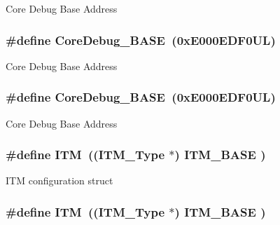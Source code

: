 Core Debug Base Address \hypertarget{group___c_m_s_i_s__core__register_ga680604dbcda9e9b31a1639fcffe5230b}{
\subsubsection[{Core\-Debug\-\_\-\-B\-A\-S\-E}]{\setlength{\rightskip}{0pt plus 5cm}\#define Core\-Debug\-\_\-\-B\-A\-S\-E~(0x\-E000\-E\-D\-F0\-U\-L)}}\label{group___c_m_s_i_s__core__register_ga680604dbcda9e9b31a1639fcffe5230b}
Core Debug Base Address \hypertarget{group___c_m_s_i_s__core__register_ga680604dbcda9e9b31a1639fcffe5230b}{
\subsubsection[{Core\-Debug\-\_\-\-B\-A\-S\-E}]{\setlength{\rightskip}{0pt plus 5cm}\#define Core\-Debug\-\_\-\-B\-A\-S\-E~(0x\-E000\-E\-D\-F0\-U\-L)}}\label{group___c_m_s_i_s__core__register_ga680604dbcda9e9b31a1639fcffe5230b}
Core Debug Base Address \hypertarget{group___c_m_s_i_s__core__register_gabae7cdf882def602cb787bb039ff6a43}{
\subsubsection[{I\-T\-M}]{\setlength{\rightskip}{0pt plus 5cm}\#define I\-T\-M~(({\bf I\-T\-M\-\_\-\-Type}       $\ast$)     {\bf I\-T\-M\-\_\-\-B\-A\-S\-E}      )}}\label{group___c_m_s_i_s__core__register_gabae7cdf882def602cb787bb039ff6a43}
I\-T\-M configuration struct \hypertarget{group___c_m_s_i_s__core__register_gabae7cdf882def602cb787bb039ff6a43}{
\subsubsection[{I\-T\-M}]{\setlength{\rightskip}{0pt plus 5cm}\#define I\-T\-M~(({\bf I\-T\-M\-\_\-\-Type}       $\ast$)     {\bf I\-T\-M\-\_\-\-B\-A\-S\-E}      )}}\label{group___c_m_s_i_s__core__register_gabae7cdf882def602cb787bb039ff6a43}

